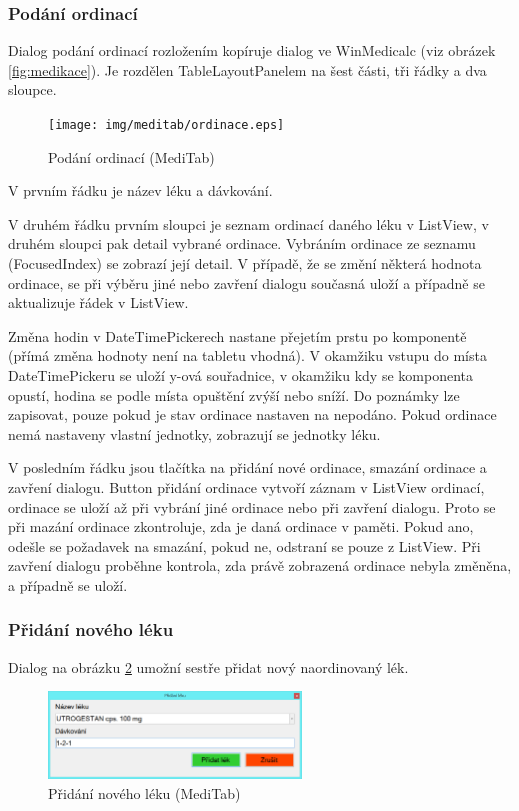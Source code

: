 \subsubsection{Podání ordinací}
\label{ch:ordinace}

Dialog podání ordinací rozložením kopíruje dialog ve WinMedicalc (viz obrázek \ref{fig:medikace}). Je rozdělen TableLayoutPanelem na šest části, tři řádky a dva sloupce.

\begin{figure}[H]
	\centering
	\texttt{[image: img/meditab/ordinace.eps]}
	\caption{Podání ordinací (MediTab)}
  \label{fig:ordinace}
\end{figure}

V prvním řádku je název léku a dávkování.

V druhém řádku prvním sloupci je seznam ordinací daného léku v ListView, v druhém sloupci pak detail vybrané ordinace. Vybráním ordinace ze seznamu (FocusedIndex) se zobrazí její detail. V případě, že se změní některá hodnota ordinace, se při výběru jiné nebo zavření dialogu současná uloží a případně se aktualizuje řádek v ListView.

Změna hodin v DateTimePickerech nastane přejetím prstu po komponentě (přímá změna hodnoty není na tabletu vhodná). V okamžiku vstupu do místa DateTimePickeru se uloží y-ová souřadnice, v okamžiku kdy se komponenta opustí, hodina se podle místa opuštění zvýší nebo sníží. Do poznámky lze zapisovat, pouze pokud je stav ordinace nastaven na nepodáno. Pokud ordinace nemá nastaveny vlastní jednotky, zobrazují se jednotky léku.

V posledním řádku jsou tlačítka na přidání nové ordinace, smazání ordinace a zavření dialogu. Button přidání ordinace vytvoří záznam v ListView ordinací, ordinace se uloží až při vybrání jiné ordinace nebo při zavření dialogu. Proto se při mazání ordinace zkontroluje, zda je daná ordinace v paměti. Pokud ano, odešle se požadavek na smazání, pokud ne, odstraní se pouze z ListView. Při zavření dialogu proběhne kontrola, zda právě zobrazená ordinace nebyla změněna, a případně se uloží.


\subsubsection{Přidání nového léku}
\label{ch:pridat_lek}

Dialog na obrázku \ref{fig:medikace_pridat_lek} umožní sestře přidat nový naordinovaný lék.

\begin{figure}[H]
	\centering
	\includegraphics[width=0.6\textwidth]{img/meditab/medikace_pridat_lek.eps}
	\caption{Přidání nového léku (MediTab)}
  \label{fig:medikace_pridat_lek}
\end{figure}

